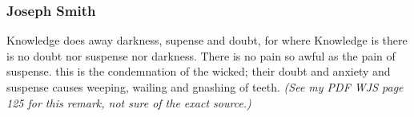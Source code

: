
	\subsubsection{Joseph Smith} %
		\label{CONDEMNATION-JS}
	
		\begin{compactdesc}
			\item[8 April 1843, Joseph Smith Diary (?)] Knowledge does away darkness, supense and doubt, for where Knowledge is there is no doubt nor suspense nor darkness. There is no pain so awful as the pain of suspense. this is the condemnation of the wicked; their doubt and anxiety and suspense causes weeping, wailing and gnashing of teeth. \textit{(See my PDF WJS page 125 for this remark, not sure of the exact source.)}
		\end{compactdesc}
	
	
	

	
